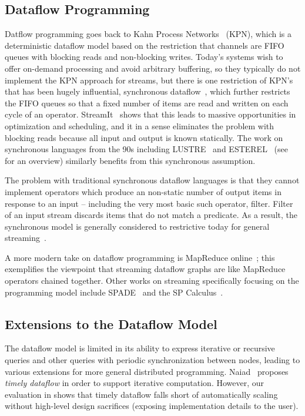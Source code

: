\subsection{Dataflow Programming}

Datflow programming goes back to Kahn Process Networks~\cite{gilles1974semantics} (KPN), which is a deterministic dataflow model based on the restriction that channels are FIFO queues with blocking reads and non-blocking writes. Today's systems wish to offer on-demand processing and avoid arbitrary buffering, so they typically do not implement the KPN approach for streams, but there is one restriction of KPN's that has been hugely influential, synchronous dataflow~\cite{lee1987synchronous}, which further restricts the FIFO queues so that a fixed number of items are read and written on each cycle of an operator. StreamIt~\cite{thies2002streamit} shows that this leads to massive opportunities in optimization and scheduling, and it in a sense eliminates the problem with blocking reads because all input and output is known statically. The work on synchronous languages from the 90s including LUSTRE~\cite{halbwachs1991synchronous} and ESTEREL~\cite{berry1992esterel} (see~\cite{BCEHlGdS2003SL} for an overview) similarly benefits from this synchronous assumption.

The problem with traditional synchronous dataflow  languages is that they cannot implement operators which produce an non-static number of output items in response to an input -- including the very most basic such operator, filter. Filter of an input stream discards items that do not match a predicate. As a result, the synchronous model is generally considered to restrictive today for general streaming~\cite{schneider2013safe}.

A more modern take on dataflow programming is MapReduce online~\cite{condie2010mapreduce}; this exemplifies the viewpoint that streaming dataflow graphs are like MapReduce operators chained together.
Other works on streaming specifically focusing on the programming model include SPADE~\cite{gedik2008spade} and the SP Calculus~\cite{soule2010universal}.

\subsection{Extensions to the Dataflow Model}

The dataflow model is limited in its ability to express iterative or recursive queries and other queries with periodic synchronization between nodes, leading to various extensions for more general distributed programming.
Naiad~\cite{Naiad2013,Timely} proposes \emph{timely dataflow} in order
to support iterative computation.
However, our evaluation in  shows that timely dataflow falls short of automatically scaling without high-level design sacrifices (exposing implementation details to the user).

